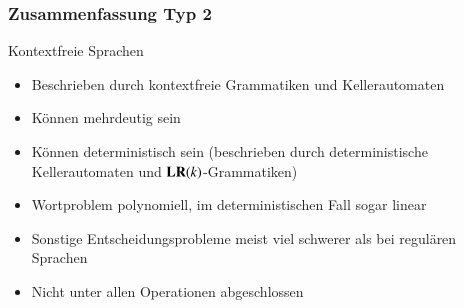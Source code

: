 \documentclass[aspectratio=1610,onlymath]{beamer}
\begin{document}
\maketitle

% 
% 


\begin{frame}\frametitle{Zusammenfassung Typ 2}

Kontextfreie Sprachen
\begin{itemize}
\item Beschrieben durch \alert{kontextfreie Grammatiken} und \alert{Kellerautomaten}
\item Können \alert{mehrdeutig} sein
\item Können \alert{deterministisch} sein (beschrieben durch deterministische Kellerautomaten und $\textbf{\textcolor{black}{LR}}(k)$-Grammatiken)
\item Wortproblem polynomiell, im deterministischen Fall sogar linear
\item Sonstige Entscheidungsprobleme meist viel schwerer als bei regulären Sprachen 
\item Nicht unter allen Operationen abgeschlossen
\end{itemize}

\end{frame}

\end{document}
